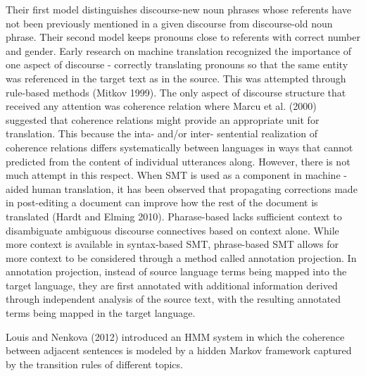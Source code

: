 Their first model distinguishes discourse-new noun phrases whose referents have not been previously mentioned in a given discourse from discourse-old noun phrase. 
Their second model keeps pronouns close to referents with correct number and gender. 
Early research on machine translation recognized the importance of one aspect of discourse - correctly translating pronouns so that the same entity was referenced in the target text  as in the source. 
This was attempted through rule-based methods (Mitkov  1999).
The only aspect of discourse structure that received any attention was coherence relation where Marcu et al. (2000) suggested that coherence relations might provide an appropriate unit for translation. 
This because the inta- and/or inter- sentential realization of coherence relations differs systematically between languages in ways that cannot predicted from the content of individual utterances along. 
However, there is not much attempt in this respect. 
When SMT is used as a component in machine -aided human translation, it has been observed that propagating corrections made in post-editing a document can improve how the rest of the document is translated (Hardt and Elming 2010). 
Pharase-based lacks sufficient context to disambiguate ambiguous discourse connectives based on context alone. 
While more context is available in syntax-based SMT, phrase-based SMT allows  for more context to be considered through a method called annotation projection. 
In annotation projection, instead of source language terms being mapped into the target language, they are first annotated with additional information derived through independent analysis of the source text, with the resulting annotated terms being mapped in the target language. 




Louis and Nenkova (2012) introduced an HMM system in which the coherence between adjacent sentences is modeled by a hidden Markov framework captured by the transition rules of different topics. 

